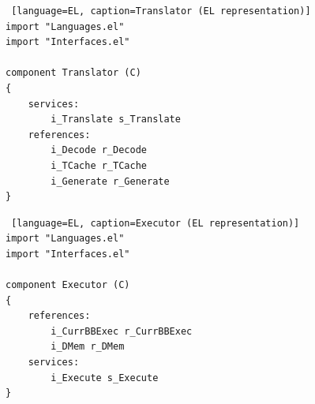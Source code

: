 \documentclass[12pt]{article}
\begin{document}
\begin{lstlisting} [language=EL, caption=Translator (EL representation)]
import "Languages.el"
import "Interfaces.el"

component Translator (C)
{
	services:
		i_Translate s_Translate
	references:
		i_Decode r_Decode  
		i_TCache r_TCache
		i_Generate r_Generate
} 
\end{lstlisting}


\begin{lstlisting} [language=EL, caption=Executor (EL representation)]
import "Languages.el"
import "Interfaces.el"

component Executor (C)
{
	references:
		i_CurrBBExec r_CurrBBExec
		i_DMem r_DMem
	services:
		i_Execute s_Execute
}
\end{lstlisting}
\end{document}
